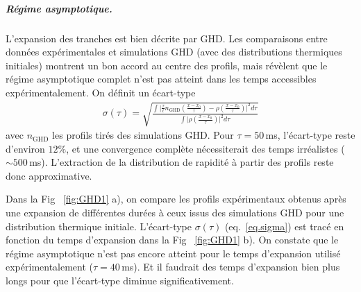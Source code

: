 \subparagraph{Régime asymptotique.}  
L’expansion des tranches est bien décrite par \gls{GHD}. Les comparaisons entre données expérimentales et simulations \gls{GHD} (avec des distributions thermiques initiales) montrent un bon accord au centre des profils, mais révèlent que le régime asymptotique complet n’est pas atteint dans les temps accessibles expérimentalement. On définit un écart-type 
\begin{eqnarray}\label{eq.sigma}
	\sigma(\tau) = \sqrt{ \frac{\int \vert \frac{\tau}{\ell} n_{\mathrm{GHD}}( \frac{x-x_0}\tau) - \rho(\frac{x-x_0}\tau) \vert^2 d \tau }{ \int \vert \rho( \frac{x-x_0}\tau) \vert^2 d \tau} }	
\end{eqnarray} avec $n_{\mathrm{GHD}}$ les profils tirés des simulations \gls*{GHD}. Pour $\tau=50$\,ms, l’écart-type reste d’environ $12\%$, et une convergence complète nécessiterait des temps irréalistes ($\sim 500$\,ms). L’extraction de la distribution de rapidité à partir des profils reste donc approximative.

\smallskip

Dans la Fig ~\ref{fig:GHD1} a), on compare les profils expérimentaux obtenus après une expansion de différentes durées à ceux issus des simulations \gls{GHD} pour une distribution thermique initiale. L’écart-type $\sigma(\tau)$ (eq.~\eqref{eq.sigma}) est tracé en fonction du temps d’expansion dans la Fig ~\ref{fig:GHD1} b). On constate que le régime asymptotique n’est pas encore atteint pour le temps d’expansion utilisé expérimentalement ($\tau = 40$\,ms). Et il faudrait des temps d’expansion bien plus longs pour que l’écart-type diminue significativement.

